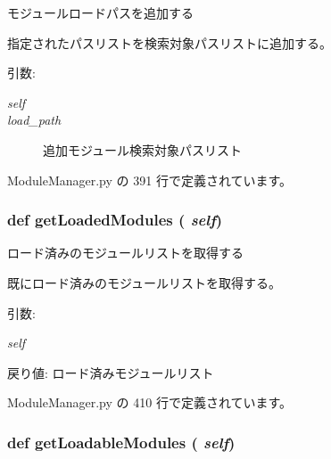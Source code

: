 モジュールロードパスを追加する 

指定されたパスリストを検索対象パスリストに追加する。

\begin{Desc}
\item[引数:]
\begin{description}
\item[{\em self}]\item[{\em load\_\-path}]追加モジュール検索対象パスリスト \end{description}
\end{Desc}


 ModuleManager.py の 391 行で定義されています。
\subsubsection{\setlength{\rightskip}{0pt plus 5cm}def getLoadedModules ( {\em self})}\label{classsource__py_1_1_module_manager_1_1_module_manager_d0a783b76cf6531672a3d266e974c05d}


ロード済みのモジュールリストを取得する 

既にロード済みのモジュールリストを取得する。

\begin{Desc}
\item[引数:]
\begin{description}
\item[{\em self}]\end{description}
\end{Desc}
\begin{Desc}
\item[戻り値:]ロード済みモジュールリスト \end{Desc}


 ModuleManager.py の 410 行で定義されています。
\subsubsection{\setlength{\rightskip}{0pt plus 5cm}def getLoadableModules ( {\em self})}\label{classsource__py_1_1_module_manager_1_1_module_manager_88d849c45b97319556566c9f92196b45}


